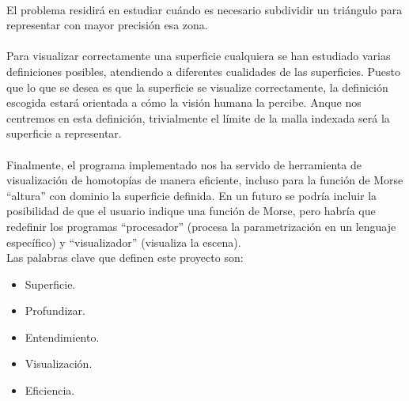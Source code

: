 \\El problema residirá en estudiar cuándo es necesario subdividir un triángulo para representar con mayor precisión esa zona.\\
\\Para visualizar correctamente una superficie cualquiera se han estudiado varias definiciones posibles, atendiendo a diferentes cualidades de las superficies. Puesto que lo que se desea es que la superficie se visualize correctamente, la definición escogida estará orientada a cómo la visión humana la percibe. Anque nos centremos en esta definición, trivialmente el límite de la malla indexada será la superficie a representar.\\
\\Finalmente, el programa implementado nos ha servido de herramienta de visualización de homotopías de manera eficiente, incluso para la función de Morse ``altura'' con dominio la superficie definida. En un futuro se podría incluir la posibilidad de que el usuario indique una función de Morse, pero habría que redefinir los programas ``procesador'' (procesa la parametrización en un lenguaje específico) y ``visualizador'' (visualiza la escena).\\

\newpage
Las palabras clave que definen este proyecto son:
\begin{itemize}
	\item Superficie.
	\item Profundizar.
	\item Entendimiento.
	\item Visualización.
	\item Eficiencia.
\end{itemize}

\endinput
